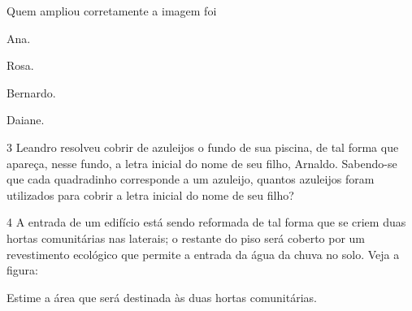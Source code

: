 Quem ampliou corretamente a imagem foi

\begin{escolha}
\item
  Ana.
\item
  Rosa.
\item
  Bernardo.
\item
  Daiane.
\end{escolha}


\num{3} Leandro resolveu cobrir de azuleijos o fundo de sua piscina, de tal
forma que apareça, nesse fundo, a letra inicial do nome de seu filho,
Arnaldo. Sabendo-se que cada quadradinho corresponde a um azuleijo,
quantos azuleijos foram utilizados para cobrir a letra inicial do nome
de seu filho?




\num{4} A entrada de um edifício está sendo reformada de tal forma que se
criem duas hortas comunitárias nas laterais; o restante do piso será coberto por um revestimento ecológico que permite a entrada da água da chuva no solo. Veja
a figura:


Estime a área que será destinada às duas hortas comunitárias.


